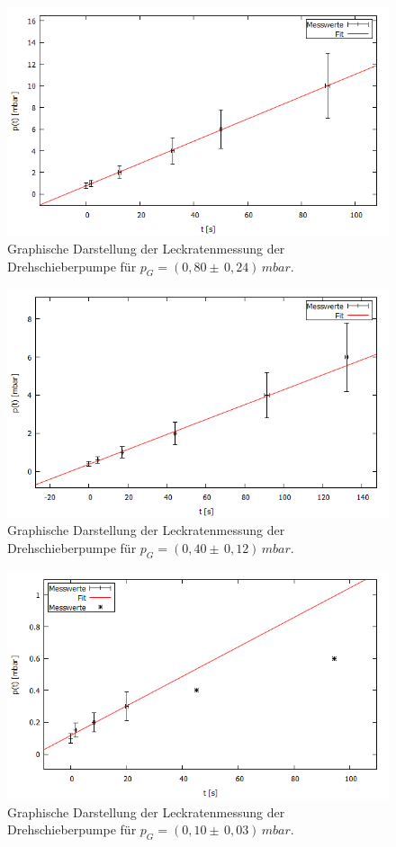 \begin{figure}[H]
  \centering
  \includegraphics[width=14cm]{bilder/leckdrehfit2.png}
	\caption{Graphische Darstellung der Leckratenmessung der Drehschieberpumpe für $p_G=(0,80 \pm \, 0,24) \, \si{mbar}$.}
  \label{leckdreh2}
\end{figure}
\begin{figure}[H]
  \centering
  \includegraphics[width=14cm]{bilder/leckdrehfit3.png}
	\caption{Graphische Darstellung der Leckratenmessung der Drehschieberpumpe für $p_G=(0,40 \pm \, 0,12) \, \si{mbar}$.}
  \label{leckdreh3}
\end{figure}
\begin{figure}[H]
  \centering
  \includegraphics[width=14cm]{bilder/leckdrehfit4.png}
	\caption{Graphische Darstellung der Leckratenmessung der Drehschieberpumpe für $p_G=(0,10 \pm \, 0,03) \, \si{mbar}$.}
  \label{leckdreh4}
\end{figure}
